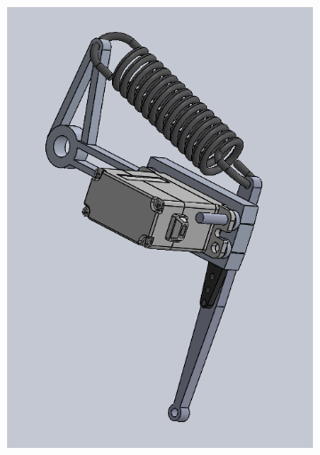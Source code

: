 \begin{figure}[h!]
    \centering
    \begin{subfigure}[b]{0.45\textwidth}
        \includegraphics[width=\textwidth]{Images/extension_spring_outside.png}
        \label{fig:extension_spring_outside}
    \end{subfigure}
    \hfill
    \begin{subfigure}[b]{0.45\textwidth}

\end{subfigure}
\end{figure}
